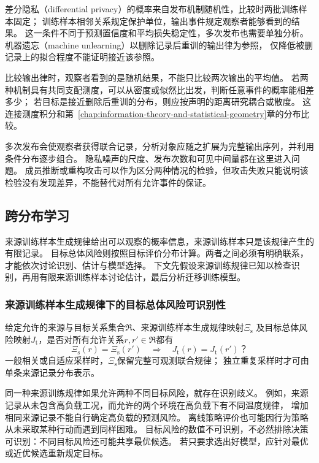 差分隐私（differential privacy）的概率来自发布机制随机性，比较时两批训练样本固定；
训练样本相邻关系规定保护单位，输出事件规定观察者能够看到的结果。
这一条件不同于预测置信度和平均损失稳定性，多次发布也需要单独分析。
机器遗忘（machine unlearning）以删除记录后重训的输出律为参照，
仅降低被删记录上的拟合程度不能证明接近该参照。

比较输出律时，观察者看到的是随机结果，不能只比较两次输出的平均值。
若两种机制具有共同支配测度，可以从密度或似然比出发，判断任意事件的概率能相差多少；
若目标是接近删除后重训的分布，则应按声明的距离研究耦合或散度。
这连接测度积分和第~\ref{chap:information-theory-and-statistical-geometry}章的分布比较。

多次发布会使观察者获得联合记录，分析对象应随之扩展为完整输出序列，并利用条件分布逐步组合。
隐私噪声的尺度、发布次数和可见中间量都在这里进入问题。
成员推断或重构攻击可以作为区分两种情况的检验，但攻击失败只能说明该检验没有发现差异，不能替代对所有允许事件的保证。

\subsection{跨分布学习}
\label{sec:future-transfer-theory-map}

来源训练样本生成规律给出可以观察的概率信息，来源训练样本只是该规律产生的有限记录。
目标总体风险则按照目标评价分布计算。两者之间必须有明确联系，才能依次讨论识别、估计与模型选择。
下文先假设来源训练规律已知以检查识别，再用有限来源训练样本讨论估计，最后分析迁移训练模型。

\subsubsection{来源训练样本生成规律下的目标总体风险可识别性}
\label{sec:future-analysis-source-target}

\begin{mathproblem}[来源训练规律是否确定目标总体风险]
  \label{question:future-source-target}
  给定允许的来源与目标关系集合$\mathfrak R$、来源训练样本生成规律映射$\Xi_{\mathrm s}$
  及目标总体风险映射$J_{\mathrm t}$，是否对所有允许关系$r,r'\in\mathfrak R$都有
  \[
    \Xi_{\mathrm s}(r)=\Xi_{\mathrm s}(r')
    \quad\Longrightarrow\quad J_{\mathrm t}(r)=J_{\mathrm t}(r')\text{？}
  \]
  一般相关或自适应采样时，$\Xi_{\mathrm s}$保留完整可观测联合规律；
  独立重复采样时才可由单条来源记录分布表示。
\end{mathproblem}

同一种来源训练规律如果允许两种不同目标风险，就存在识别歧义。
例如，来源记录从未包含高负载工况，而允许的两个环境在高负载下有不同温度规律，
增加相同来源记录不能自行确定高负载的预测风险。
离线策略评价也可能因行为策略从未采取某种行动而遇到同样困难。
目标风险的数值不可识别，不必然排除决策可识别：不同目标风险还可能共享最优候选。
若只要求选出好模型，应针对最优或近优候选重新规定目标。

